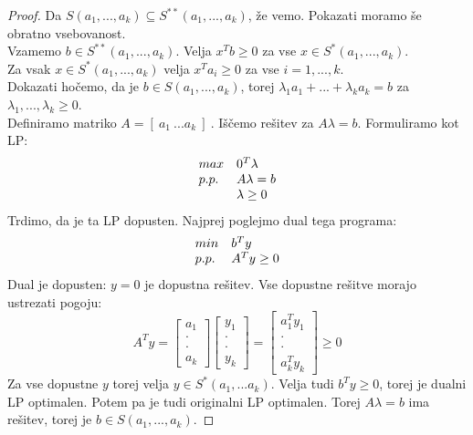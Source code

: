 \documentclass[11pt, a4paper]{article}
\begin{document}
    \begin{proof}
        Da \(S(a_1,...,a_k) \subseteq S^{**}(a_1,...,a_k)\), že vemo. Pokazati moramo še obratno vsebovanost. \\
        Vzamemo \(b \in S^{**}(a_1,...,a_k)\). Velja \(x^T b \ge 0\) za vse \(x \in S^*(a_1,...,a_k)\). \\
        Za vsak \(x \in S^*(a_1,...,a_k)\) velja \(x^T a_i \ge 0\) za vse \(i=1,...,k\). \\
        Dokazati hočemo, da je \(b \in S(a_1,...,a_k)\), torej \(\lambda_1 a_1 + ... + \lambda_k a_k = b\) za \(\lambda_1,...,\lambda_k \ge 0\). \\
        Definiramo matriko \(A = [\ a_1\ ... a_k\ ]\ \). Iščemo rešitev za \(A \lambda = b\). Formuliramo kot LP:
        \[
            \begin{array}{l l}
                max & 0^T \lambda \\
                p.p. & A \lambda = b \\
                & \lambda \ge 0
            \end{array}  
        \]
        Trdimo, da je ta LP dopusten. Najprej poglejmo dual tega programa:
        \[
            \begin{array}{l l}
                min & b^T y \\
                p.p. & A^T y \ge 0
            \end{array}
        \]
        Dual je dopusten: \(y=0\) je dopustna rešitev. Vse dopustne rešitve morajo ustrezati pogoju:
        \[
            A^T y = 
            \begin{bmatrix}
                a_1 \\
                \cdot \\
                \cdot \\
                a_k
            \end{bmatrix}
            \begin{bmatrix}
                y_1 \\
                \cdot \\
                \cdot \\
                y_k
            \end{bmatrix}
            =
            \begin{bmatrix}
                a_1^T y_1 \\
                \cdot \\
                \cdot \\
                a_k^T y_k
            \end{bmatrix}
            \ge 0
        \]
        Za vse dopustne \(y\) torej velja \(y \in S^*(a_1,...a_k)\). Velja tudi \(b^T y \ge 0\), torej je dualni LP optimalen. Potem pa je tudi originalni LP optimalen. Torej \(A \lambda = b\) ima rešitev, torej je \(b \in S(a_1,...,a_k)\).
    \end{proof}
\end{document}
